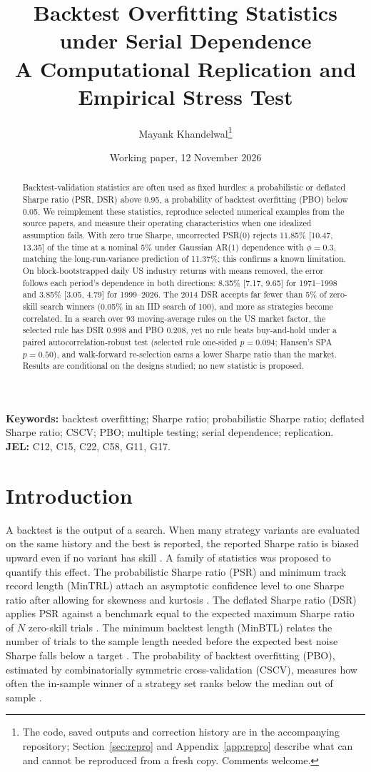 \documentclass[11pt,a4paper]{article}
\title{\Large\textbf{Backtest Overfitting Statistics under Serial Dependence}\\[4pt] \large A Computational Replication and Empirical Stress Test}
\author{Mayank Khandelwal\thanks{The code, saved outputs and correction history are in the accompanying repository; Section~\ref{sec:repro} and Appendix~\ref{app:repro} describe what can and cannot be reproduced from a fresh copy. Comments welcome.}}
\date{Working paper, 12 November 2026}
\theoremstyle{remark}
\begin{document}
\maketitle

\begin{abstract}
\noindent
Backtest-validation statistics are often used as fixed hurdles: a probabilistic or deflated Sharpe ratio (PSR, DSR) above 0.95, a probability of backtest overfitting (PBO) below 0.05. We reimplement these statistics, reproduce selected numerical examples from the source papers, and measure their operating characteristics when one idealized assumption fails. With zero true Sharpe, uncorrected PSR(0) rejects 11.85\% [10.47, 13.35] of the time at a nominal 5\% under Gaussian AR(1) dependence with $\phi=0.3$, matching the long-run-variance prediction of 11.37\%; this confirms a known limitation. On block-bootstrapped daily US industry returns with means removed, the error follows each period's dependence in both directions: 8.35\% [7.17, 9.65] for 1971--1998 and 3.85\% [3.05, 4.79] for 1999--2026. The 2014 DSR accepts far fewer than 5\% of zero-skill search winners (0.05\% in an IID search of 100), and more as strategies become correlated. In a search over 93 moving-average rules on the US market factor, the selected rule has DSR 0.998 and PBO 0.208, yet no rule beats buy-and-hold under a paired autocorrelation-robust test (selected rule one-sided $p=0.094$; Hansen's SPA $p=0.50$), and walk-forward re-selection earns a lower Sharpe ratio than the market. Results are conditional on the designs studied; no new statistic is proposed.
\end{abstract}

\noindent\textbf{Keywords:} backtest overfitting; Sharpe ratio; probabilistic Sharpe ratio; deflated Sharpe ratio; CSCV; PBO; multiple testing; serial dependence; replication.\\
\noindent\textbf{JEL:} C12, C15, C22, C58, G11, G17.

\section{Introduction}\label{sec:intro}

A backtest is the output of a search. When many strategy variants are evaluated on the same history and the best is reported, the reported Sharpe ratio is biased upward even if no variant has skill \citep{bailey2014pseudo,harvey2016cross}. A family of statistics was proposed to quantify this effect. The probabilistic Sharpe ratio (PSR) and minimum track record length (MinTRL) attach an asymptotic confidence level to one Sharpe ratio after allowing for skewness and kurtosis \citep{bailey2012frontier}. The deflated Sharpe ratio (DSR) applies PSR against a benchmark equal to the expected maximum Sharpe ratio of $N$ zero-skill trials \citep{bailey2014dsr}. The minimum backtest length (MinBTL) relates the number of trials to the sample length needed before the expected best noise Sharpe falls below a target \citep{bailey2014pseudo}. The probability of backtest overfitting (PBO), estimated by combinatorially symmetric cross-validation (CSCV), measures how often the in-sample winner of a strategy set ranks below the median out of sample \citep{bailey2017pbo}.
\end{document}
